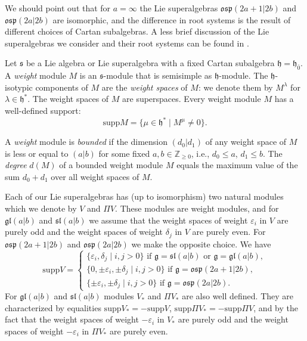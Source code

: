 \documentclass[12pt]{amsart}
\makeatletter
\def\@putname#1#2#3#4{\def\@@ref{#3}\let\old@bf\bf
        \def\bf##1{\old@bf\if?\noexpand##1?{#4}\else##1\fi}%
	#1{#2}%
        \let\bf\old@bf}
\def\@putname#1#2#3#4{\def\@@ref{#3}\let\old@bf\bf	%
	\let\old@reset@font\reset@font			%
        \def\bf##1{\old@bf\if?\noexpand##1?{#4}\else##1\fi}%
	\def\reset@font##1##2{\old@reset@font##1\if?\noexpand##2?{#4}\else##2\fi}#1{#2}%
        \let\bf\old@bf\let\reset@font\old@reset@font}
\let\my@cite=\cite
\def\cite#1{\@putname\my@cite{#1}{\@citeb}{\tiny\rm\@@ref}}
\theoremstyle{plain} %
\numberwithin{equation}{section}
\theoremstyle{definition}
\theoremstyle{remark}
\theoremstyle{plain} %
\renewcommand{\gg}{\mathfrak{g}}
\renewcommand{\sl}{\mathfrak{sl}}
\newcommand{\osp}{\mathfrak{osp}}
\newcommand{\supp}{\mathrm{supp}}
\newcommand{\gh}{\mathfrak{h}}
\def\gg{\mathfrak{g}}
\def\gh{\mathfrak{h}}
\def\gl{\mathfrak{l}}
\makeatother
\begin{document}
We should point out that for $a=\infty$  the Lie superalgebras $\osp(2a+1|2b)$ and $\osp(2a|2b)$ are isomorphic, and the difference in root systems is the result of different choices of Cartan subalgebras. A less brief discussion of the Lie superalgebras we consider and their root systems can be found in \cite{CP}.



Let $\mathfrak s$ be a Lie algebra or Lie superalgebra with a fixed Cartan subalgebra $\mathfrak h =\mathfrak h_{\bar{0}}$. A \emph{weight}  module $M$ is an $\mathfrak s$-module that is semisimple as $\mathfrak h$-module. The $\mathfrak h$-isotypic components of $M$ are the \emph{weight spaces} of $M$: we denote them by $M^{\lambda}$ for $\lambda \in \gh^*$.  The weight spaces of $M$ are superspaces. Every weight module $M$ has a well-defined support:
       $$ \supp  M = \{\mu \in \gh^* \; | \; M^{\mu} \neq 0 \}. $$

A \emph{weight}  module is \emph{bounded} if the dimension $(d_0|d_1)$ of any weight space of $M$ is less or equal to  $(a|b)$ for some fixed $a,b \in \mathbb Z_{\geq 0}$, i.e., $d_0\leq a$, $d_1\leq b$. The \emph{degree} $d (M)$ of a bounded weight module $M$ equals the maximum value of the sum $d_0+d_1$ over all weight spaces of $M$.

Each of our Lie superalgebras has (up to isomorphism) two natural modules which we denote by $V$ and $\Pi V$. These modules are weight modules, and for $\gg \gl (a|b)$ and $\sl (a|b)$ we assume that the weight spaces of  weight $\varepsilon_i$ in $V$ are purely odd and  the weight spaces of weight $\delta_j$ in $V$ are purely even. For $\osp (2a+1|2b)$ and $\osp (2a|2b)$   we make the opposite choice. We have
$$
\supp V = \begin{cases} \{ \varepsilon_i, \delta_j \; | \; i,j>0\} \mbox{ if } \gg = \sl(a|b)  \mbox{ or }  \gg = \gg \gl(a|b) ,\\ 
\{ 0, \pm \varepsilon_i, \pm \delta_j \; | \; i,j>0\} \mbox{ if } \gg = \osp(2a+1|2b),\\
\{ \pm \varepsilon_i, \pm \delta_j \; | \; i,j>0\} \mbox{ if } \gg = \osp(2a|2b).
\end{cases}
$$
For $\gg \gl (a|b)$ and  $\sl (a|b)$ modules $V_*$ and $\Pi V_*$ are also well defined. They are characterized by equalities  $\supp V_*= -\supp V$, $\supp \Pi V_*= -\supp \Pi V$, and by the fact that the weight spaces  of  weight $-\varepsilon_i$ in $V_*$ are purely odd and  the weight spaces of weight $-\varepsilon_i$ in $\Pi V_*$ are purely even. 
\end{document}
